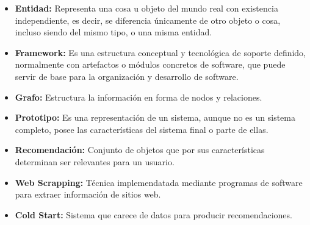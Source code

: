 \begin{itemize}
  \item \textbf{Entidad:} Representa una cosa u objeto del mundo real con existencia independiente, es decir, se diferencia únicamente de otro objeto o cosa, incluso siendo del mismo tipo, o una misma entidad.
  \item \textbf{Framework: }Es una estructura conceptual y tecnológica de soporte definido, normalmente con artefactos o módulos concretos de software, que puede servir de base para la organización y desarrollo de software. 
   \item \textbf{Grafo:} Estructura la información en forma de nodos y relaciones.
   \item \textbf{Prototipo:} Es una representación de un sistema, aunque no es un sistema completo, posee las características del sistema final o parte de ellas.
   \item \textbf{Recomendación:} Conjunto de objetos que por sus características determinan ser relevantes para un usuario. 
   \item \textbf{Web Scrapping:} Técnica implemendatada mediante programas de software para extraer información de sitios web.
    \item \textbf{Cold Start:} Sistema que carece de datos para producir recomendaciones.
\end{itemize}
